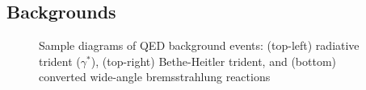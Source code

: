 \documentclass[b1]{sciposter}
\begin{document}
\begin{multicols}{3}



	\subsection*{Backgrounds}
	\begin{figure}
		\begin{center}
		\end{center}
		\caption{Sample diagrams of QED background events: (top-left) radiative trident ($\gamma^*$), (top-right) Bethe-Heitler trident, and (bottom) converted wide-angle bremsstrahlung reactions}
	\end{figure}


\end{multicols}
\end{document}
